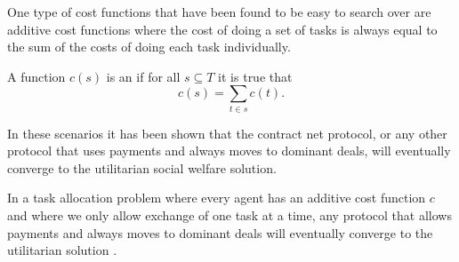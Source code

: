 One type of cost functions that have been found to be easy to search
over are additive cost functions where the cost of doing a set of
tasks is always equal to the sum of the costs of doing each task
individually.
\begin{definition}
  A function $c(s)$ is an  if for all $s
  \subseteq T$ it is true that
  \[ c(s) = \sum_{t \in s} c(t). \]
\end{definition}

In these scenarios it has been shown that the contract net protocol,
or any other protocol that uses payments and always moves to dominant
deals, will eventually converge to the utilitarian social welfare
solution.

\begin{theorem}
  \label{th:additive}
  In a task allocation problem where every agent has an additive cost
  function $c$ and where we only allow exchange of one task at a
  time, any protocol that allows payments and always moves to dominant
  deals will eventually converge to the utilitarian solution
  \cite{endriss06b}.
\end{theorem}


